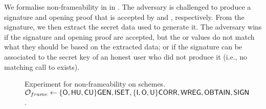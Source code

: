 We formalise non-frameability in \ExpNonframe in .
The adversary is challenged to produce a signature
and opening proof that is accepted by \Verify and \Judge, respectively. From
the signature, we then extract the secret data used to generate it. The
adversary wins if the signature and opening proof are accepted, but the \yeval
or \yinsp values do not match what they should be based on the extracted data;
or if the signature can be associated to the secret key of an honest user who
did not produce it (i.e., no matching call to \SIGN exists).

\begin{figure}[htp!]  
  \centering
  \caption{Experiment for non-frameability on \UAS schemes.
    $\mathcal{O}_{frame} \gets \lbrace\mathsf{O},\mathsf{HU},\mathsf{CU}\rbrace\mathsf{GEN},\mathsf{ISET},\lbrace\mathsf{I},\mathsf{O},\mathsf{U}\rbrace
    \mathsf{CORR},\mathsf{WREG},\mathsf{OBTAIN},\mathsf{SIGN}$.}
  \label{fig:exp-uas-frame}
\end{figure}

